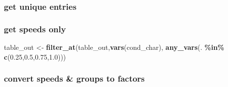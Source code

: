 \documentclass[
]{article}
\newenvironment{Shaded}{\begin{snugshade}}{\end{snugshade}}
\newcommand{\FunctionTok}[1]{\textcolor[rgb]{0.13,0.29,0.53}{\textbf{#1}}}
\newcommand{\NormalTok}[1]{#1}
\newcommand{\OtherTok}[1]{\textcolor[rgb]{0.56,0.35,0.01}{#1}}
\newcommand{\SpecialCharTok}[1]{\textcolor[rgb]{0.81,0.36,0.00}{\textbf{#1}}}
\newcommand{\StringTok}[1]{\textcolor[rgb]{0.31,0.60,0.02}{#1}}
\begin{document}
\hypertarget{get-unique-entries}{%
\subsubsection{get unique entries}\label{get-unique-entries}}

\begin{Shaded}
\end{Shaded}

\hypertarget{get-speeds-only}{%
\subsubsection{get speeds only}\label{get-speeds-only}}

\begin{Shaded}
\begin{Highlighting}[]
\NormalTok{table\_out }\OtherTok{\textless{}{-}} \FunctionTok{filter\_at}\NormalTok{(table\_out,}\FunctionTok{vars}\NormalTok{(}\StringTok{\textquotesingle{}cond\_char\textquotesingle{}}\NormalTok{), }\FunctionTok{any\_vars}\NormalTok{(. }\SpecialCharTok{\%in\%} \FunctionTok{c}\NormalTok{(}\StringTok{\textquotesingle{}0.25\textquotesingle{}}\NormalTok{,}\StringTok{\textquotesingle{}0.5\textquotesingle{}}\NormalTok{,}\StringTok{\textquotesingle{}0.75\textquotesingle{}}\NormalTok{,}\StringTok{\textquotesingle{}1.0\textquotesingle{}}\NormalTok{))) }
\end{Highlighting}
\end{Shaded}

\hypertarget{convert-speeds-groups-to-factors}{%
\subsubsection{convert speeds \& groups to
factors}\label{convert-speeds-groups-to-factors}}
\end{document}
